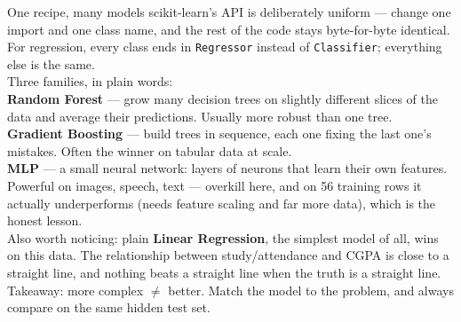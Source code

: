 \documentclass[aspectratio=169,11pt]{beamer}
\begin{document}
\begin{frame}{One recipe, many models}
{    scikit-learn's API is deliberately uniform --- change one import and one
    class name, and the rest of the code stays byte-for-byte identical. For
    regression, every class ends in \texttt{Regressor} instead of
    \texttt{Classifier}; everything else is the same.\\
    Three families, in plain words:\\
    \textbf{Random Forest} --- grow many decision trees on slightly different
    slices of the data and average their predictions. Usually more robust than
    one tree.\\
    \textbf{Gradient Boosting} --- build trees in sequence, each one fixing the
    last one's mistakes. Often the winner on tabular data at scale.\\
    \textbf{MLP} --- a small neural network: layers of neurons that learn their
    own features. Powerful on images, speech, text --- overkill here, and on 56
    training rows it actually underperforms (needs feature scaling and far more
    data), which is the honest lesson.\\
    Also worth noticing: plain \textbf{Linear Regression}, the simplest model
    of all, wins on this data. The relationship between study/attendance and
    CGPA is close to a straight line, and nothing beats a straight line when
    the truth is a straight line.\\
    Takeaway: more complex $\neq$ better. Match the model to the problem, and
    always compare on the same hidden test set.}
\end{frame}
\end{document}
